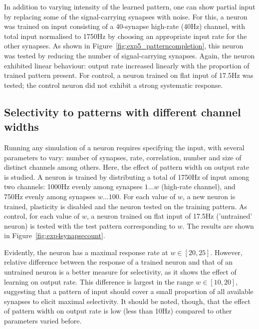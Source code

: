 \documentclass[a4paper,12pt]{report}
\theoremstyle{definition}
\begin{document}
In addition to varying intensity of the learned pattern, one can show partial input by replacing some of the signal-carrying synapses with noise. For this, a neuron was trained on input consisting of a 40-synapse high-rate (40Hz) channel, with total input normalised to 1750Hz by choosing an appropriate input rate for the other synapses. As shown in Figure~\ref{fig:exp5_patterncompletion}, this neuron was tested by reducing the number of signal-carrying synapses. Again, the neuron exhibited linear behaviour: output rate increased linearly with the proportion of trained pattern present. For control, a neuron trained on flat input of 17.5Hz was tested; the control neuron did not exhibit a strong systematic response.







\subsection{Selectivity to patterns with different channel widths}
\label{subsec:patternwidths}


Running any simulation of a neuron requires specifying the input, with several parameters to vary: number of synapses, rate, correlation, number and size of distinct channels among others. Here, the effect of pattern width on output rate is studied. A neuron is trained by distributing a total of 1750Hz of input among two channels: 1000Hz evenly among synapses $1 \ldots w$ (high-rate channel), and 750Hz evenly among synapses $w \ldots 100$. For each value of $w$, a new neuron is trained, plasticity is disabled and the neuron tested on the training pattern. As control, for each value of $w$, a neuron trained on flat input of 17.5Hz ('untrained' neuron) is tested with the test pattern corresponding to $w$. The results are shown in Figure~\ref{fig:exp4synapsecount}.

Evidently, the neuron has a maximal response rate at $w\in[20,25]$. However, relative difference between the response of a trained neuron and that of an untrained neuron is a better measure for selectivity, as it shows the effect of learning on output rate. This difference is largest in the range $w \in [10,20]$, suggesting that a pattern of input should cover a small proportion of all available synapses to elicit maximal selectivity. It should be noted, though, that the effect of pattern width on output rate is low (less than 10Hz) compared to other parameters varied before.
\end{document}
